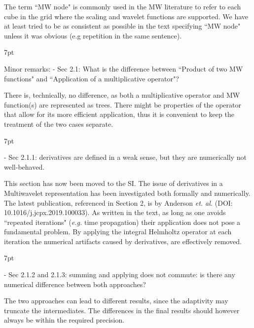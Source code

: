 \documentclass[11pt]{article}
\newenvironment{formal}{%
  \def\FrameCommand{%
    \hspace{1pt}%
    {\color{darkblue}\vrule width 2pt}%
    {\color{formalshade}\vrule width 4pt}%
    \colorbox{formalshade}%
  }%
  \MakeFramed{\advance\hsize-\width\FrameRestore}%
  \noindent\hspace{-4.55pt}%
  \begin{adjustwidth}{}{7pt}%
  \vspace{2pt}\vspace{2pt}%
}
{%
  \vspace{2pt}\end{adjustwidth}\endMakeFramed%
}
\begin{document}
 The term ``MW node" is commonly used in the MW literature to refer to each cube in the grid where the scaling and wavelet functions are supported. We have at least tried to be as consistent as possible in the text specifying ``MW node" unless it was obvious (e.g repetition in the same sentence).
 
\begin{formal}
Minor remarks:
 - Sec 2.1: What is the difference between ``Product of two MW functions" and ``Application of a multiplicative operator"?
 \end{formal}
 
 There is, technically, no difference, as both a multiplicative operator and MW function(s) are represented as trees. There might be properties of the operator that allow for its more efficient application, thus it is convenient to keep the treatment of the two cases separate.
 
 \begin{formal}
 - Sec 2.1.1: derivatives are defined in a weak sense, but they are numerically not well-behaved.
 \end{formal}
 
 This section has now been moved to the SI. The issue of derivatives in a Multiwavelet representation has been investigated both formally and numerically. The latest publication, referenced in Section 2, is by Anderson \emph{et. al.} (DOI: 10.1016/j.jcpx.2019.100033). As written in the text, as long as one avoids ``repeated iterations" (\emph{e.g.} time propagation) their application does not pose a fundamental problem. By applying the integral Helmholtz operator at each iteration the numerical artifacts caused by derivatives, are effectively removed.
 
 \begin{formal}
 - Sec 2.1.2 and 2.1.3: summing and applying does not commute: is there any numerical difference between both approaches?
 \end{formal}
 
 
 The two approaches can lead to different results, since the adaptivity may truncate the intermediates. The differences in the final results should however always be within the required precision.
 
\end{document}
